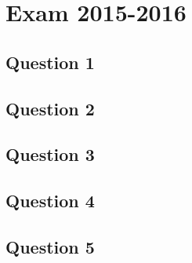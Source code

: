 \section{Exam 2015-2016}

\subsection{Question 1}
\subsection{Question 2}
\subsection{Question 3}
\subsection{Question 4}
\subsection{Question 5}